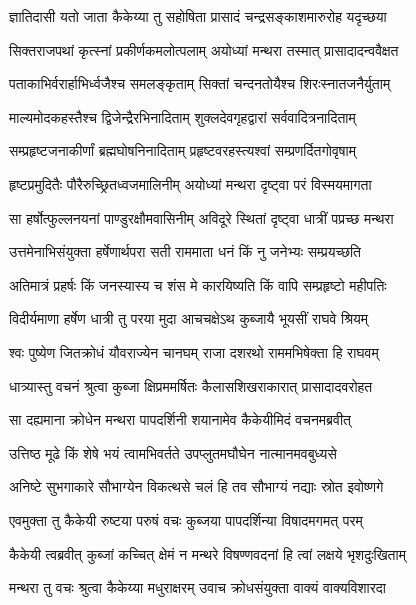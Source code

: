
\twolineshloka
{ज्ञातिदासी यतो जाता कैकेय्या तु सहोषिता}
{प्रासादं चन्द्रसङ्काशमारुरोह यदृच्छया} %

\twolineshloka
{सिक्तराजपथां कृत्स्नां प्रकीर्णकमलोत्पलाम्}
{अयोध्यां मन्थरा तस्मात् प्रासादादन्ववैक्षत} %

\twolineshloka
{पताकाभिर्वरार्हाभिर्ध्वजैश्च समलङ्कृताम्}
{सिक्तां चन्दनतोयैश्च शिरःस्नातजनैर्युताम्} %

\twolineshloka
{माल्यमोदकहस्तैश्च द्विजेन्द्रैरभिनादिताम्}
{शुक्लदेवगृहद्वारां सर्ववादित्रनादिताम्} %

\twolineshloka
{सम्प्रहृष्टजनाकीर्णां ब्रह्मघोषनिनादिताम्}
{प्रहृष्टवरहस्त्यश्वां सम्प्रणर्दितगोवृषाम्} %

\twolineshloka
{हृष्टप्रमुदितैः पौरैरुच्छ्रितध्वजमालिनीम्}
{अयोध्यां मन्थरा दृष्ट्वा परं विस्मयमागता} %

\twolineshloka
{सा हर्षोत्फुल्लनयनां पाण्डुरक्षौमवासिनीम्}
{अविदूरे स्थितां दृष्ट्वा धात्रीं पप्रच्छ मन्थरा} %

\twolineshloka
{उत्तमेनाभिसंयुक्ता हर्षेणार्थपरा सती}
{राममाता धनं किं नु जनेभ्यः सम्प्रयच्छति} %

\twolineshloka
{अतिमात्रं प्रहर्षः किं जनस्यास्य च शंस मे}
{कारयिष्यति किं वापि सम्प्रहृष्टो महीपतिः} %

\twolineshloka
{विदीर्यमाणा हर्षेण धात्री तु परया मुदा}
{आचचक्षेऽथ कुब्जायै भूयसीं राघवे श्रियम्} %

\twolineshloka
{श्वः पुष्येण जितक्रोधं यौवराज्येन चानघम्}
{राजा दशरथो राममभिषेक्ता हि राघवम्} %

\twolineshloka
{धात्र्यास्तु वचनं श्रुत्वा कुब्जा क्षिप्रममर्षितः}
{कैलासशिखराकारात् प्रासादादवरोहत} %

\twolineshloka
{सा दह्यमाना क्रोधेन मन्थरा पापदर्शिनी}
{शयानामेव कैकेयीमिदं वचनमब्रवीत्} %

\twolineshloka
{उत्तिष्ठ मूढे किं शेषे भयं त्वामभिवर्तते}
{उपप्लुतमघौघेन नात्मानमवबुध्यसे} %

\twolineshloka
{अनिष्टे सुभगाकारे सौभाग्येन विकत्थसे}
{चलं हि तव सौभाग्यं नद्याः स्रोत इवोष्णगे} %

\twolineshloka
{एवमुक्ता तु कैकेयी रुष्टया परुषं वचः}
{कुब्जया पापदर्शिन्या विषादमगमत् परम्} %

\twolineshloka
{कैकेयी त्वब्रवीत् कुब्जां कच्चित् क्षेमं न मन्थरे}
{विषण्णवदनां हि त्वां लक्षये भृशदुःखिताम्} %

\twolineshloka
{मन्थरा तु वचः श्रुत्वा कैकेय्या मधुराक्षरम्}
{उवाच क्रोधसंयुक्ता वाक्यं वाक्यविशारदा} %

